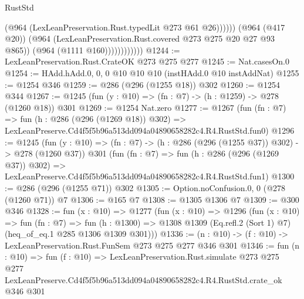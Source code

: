 \begin{lexlean}{RustStd}
\begin{coremodule}
                                (@964 (LexLeanPreservation.Rust.typedLit @273 @61 @26))))))
                        (@964 (@417 @20))
                        (@964 (LexLeanPreservation.Rust.covered @273 @275 @20 @27 @93 @865))
                        (@964 (@1111 @160))))))))))))
@1244 := LexLeanPreservation.Rust.CrateOK @273 @275 @277
@1245 := Nat.casesOn.{0}
@1254 := HAdd.hAdd.{0, 0, 0} @10 @10 @10 (instHAdd.{0} @10 instAddNat)
@1255 := @1254 @346
@1259 := @286 (@296 (@1255 @18)) @302
@1260 := @1254 @344
@1267 := @1245 (fun (y : @10) => (fn : @7) -> (h : @1259) -> @278 (@1260 @18)) @301
@1269 := @1254 Nat.zero
@1277 := @1267
    (fun (fn : @7) =>
    fun (h : @286 (@296 (@1269 @18)) @302) =>
    LexLeanPreserve.Cd4f5f5b96a513dd094a04890658282c4.R4.RustStd.fun0)
@1296 := @1245
    (fun (y : @10) => (fn : @7) -> (h : @286 (@296 (@1255 @37)) @302) -> @278 (@1260 @37))
    @301
    (fun (fn : @7) =>
    fun (h : @286 (@296 (@1269 @37)) @302) =>
    LexLeanPreserve.Cd4f5f5b96a513dd094a04890658282c4.R4.RustStd.fun1)
@1300 := @286 (@296 (@1255 @71)) @302
@1305 := Option.noConfusion.{0, 0} (@278 (@1260 @71)) @7
@1306 := @165 @7
@1308 := @1305 @1306 @7
@1309 := @300 @346
@1328 := fun (x : @10) =>
  @1277
    (fun (x : @10) =>
    @1296
      (fun (x : @10) =>
      fun (fn : @7) =>
      fun (h : @1300) =>
      @1308 @1309 (Eq.refl.{2} (Sort 1) @7) (heq_of_eq.{1} @285 @1306 @1309 @301)))
@1336 := (n : @10) -> (f : @10) -> LexLeanPreservation.Rust.FunSem @273 @275 @277 @346 @301
@1346 := fun (n : @10) =>
  fun (f : @10) =>
  LexLeanPreservation.Rust.simulate
    @273
    @275
    @277
    LexLeanPreserve.Cd4f5f5b96a513dd094a04890658282c4.R4.RustStd.crate_ok
    @346
    @301
\end{coremodule}
\end{lexlean}
